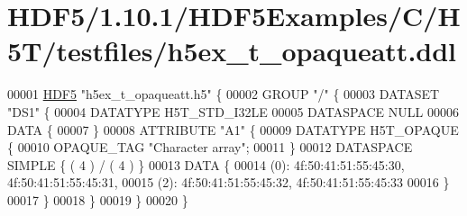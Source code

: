 \hypertarget{_h_d_f5_21_810_81_2_h_d_f5_examples_2_c_2_h5_t_2testfiles_2h5ex__t__opaqueatt_8ddl_source}{}\section{H\+D\+F5/1.10.1/\+H\+D\+F5\+Examples/\+C/\+H5\+T/testfiles/h5ex\+\_\+t\+\_\+opaqueatt.ddl}
\label{_h_d_f5_21_810_81_2_h_d_f5_examples_2_c_2_h5_t_2testfiles_2h5ex__t__opaqueatt_8ddl_source}

\begin{DoxyCode}
00001 \hyperlink{namespace_h_d_f5}{HDF5} \textcolor{stringliteral}{"h5ex\_t\_opaqueatt.h5"} \{
00002 GROUP \textcolor{stringliteral}{"/"} \{
00003    DATASET \textcolor{stringliteral}{"DS1"} \{
00004       DATATYPE  H5T\_STD\_I32LE
00005       DATASPACE  NULL
00006       DATA \{
00007       \}
00008       ATTRIBUTE \textcolor{stringliteral}{"A1"} \{
00009          DATATYPE  H5T\_OPAQUE \{
00010             OPAQUE\_TAG \textcolor{stringliteral}{"Character array"};
00011          \}
00012          DATASPACE  SIMPLE \{ ( 4 ) / ( 4 ) \}
00013          DATA \{
00014          (0): 4f:50:41:51:55:45:30, 4f:50:41:51:55:45:31,
00015          (2): 4f:50:41:51:55:45:32, 4f:50:41:51:55:45:33
00016          \}
00017       \}
00018    \}
00019 \}
00020 \}
\end{DoxyCode}
